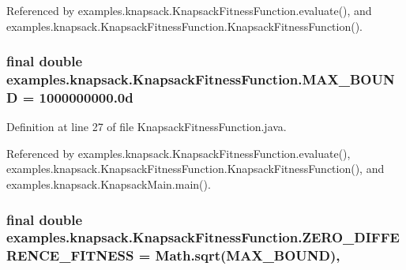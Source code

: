 Referenced by examples.\-knapsack.\-Knapsack\-Fitness\-Function.\-evaluate(), and examples.\-knapsack.\-Knapsack\-Fitness\-Function.\-Knapsack\-Fitness\-Function().

\hypertarget{classexamples_1_1knapsack_1_1_knapsack_fitness_function_ac8acc4adf78a41b5209d5cd185179c4a}{
\subsubsection[{M\-A\-X\-\_\-\-B\-O\-U\-N\-D}]{\setlength{\rightskip}{0pt plus 5cm}final double examples.\-knapsack.\-Knapsack\-Fitness\-Function.\-M\-A\-X\-\_\-\-B\-O\-U\-N\-D = 1000000000.\-0d\hspace{0.3cm}{\ttfamily [static]}}}\label{classexamples_1_1knapsack_1_1_knapsack_fitness_function_ac8acc4adf78a41b5209d5cd185179c4a}


Definition at line 27 of file Knapsack\-Fitness\-Function.\-java.



Referenced by examples.\-knapsack.\-Knapsack\-Fitness\-Function.\-evaluate(), examples.\-knapsack.\-Knapsack\-Fitness\-Function.\-Knapsack\-Fitness\-Function(), and examples.\-knapsack.\-Knapsack\-Main.\-main().

\hypertarget{classexamples_1_1knapsack_1_1_knapsack_fitness_function_a72ab901a09447f44aa3e1660af2a5b0f}{
\subsubsection[{Z\-E\-R\-O\-\_\-\-D\-I\-F\-F\-E\-R\-E\-N\-C\-E\-\_\-\-F\-I\-T\-N\-E\-S\-S}]{\setlength{\rightskip}{0pt plus 5cm}final double examples.\-knapsack.\-Knapsack\-Fitness\-Function.\-Z\-E\-R\-O\-\_\-\-D\-I\-F\-F\-E\-R\-E\-N\-C\-E\-\_\-\-F\-I\-T\-N\-E\-S\-S = Math.\-sqrt({\bf M\-A\-X\-\_\-\-B\-O\-U\-N\-D})\hspace{0.3cm}{\ttfamily [static]}, {\ttfamily [private]}}}\label{classexamples_1_1knapsack_1_1_knapsack_fitness_function_a72ab901a09447f44aa3e1660af2a5b0f}


